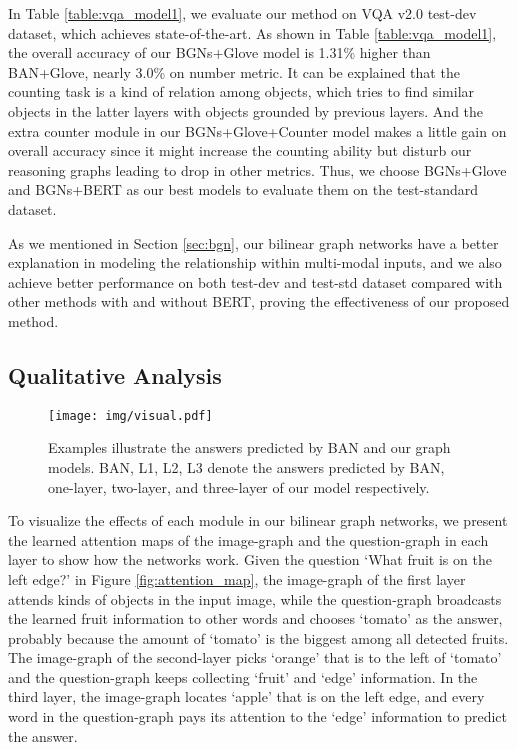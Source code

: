 \documentclass[10pt,twocolumn,letterpaper]{article}
\begin{document}
In Table \ref{table:vqa_model1}, we evaluate our method on VQA v2.0 test-dev dataset, which achieves state-of-the-art. As shown in Table \ref{table:vqa_model1}, the overall accuracy of our BGNs+Glove model is 1.31\% higher than BAN+Glove, nearly 3.0\% on number metric. It can be explained that the counting task is a kind of relation among objects, which tries to find similar objects in the latter layers with objects grounded by previous layers. And the extra counter module \cite{zhang2018learning} in our BGNs+Glove+Counter model makes a little gain on overall accuracy since it might increase the counting ability but disturb our reasoning graphs leading to drop in other metrics. Thus, we choose BGNs+Glove and BGNs+BERT as our best models to evaluate them on the test-standard dataset. 

As we mentioned in Section \ref{sec:bgn}, our bilinear graph networks have a better explanation in modeling the relationship within multi-modal inputs, and we also achieve better performance on both test-dev and test-std dataset compared with other methods with and without BERT, proving the effectiveness of our proposed method.

\vspace{-5pt}
\subsection{Qualitative Analysis}
\begin{figure*}
	\centering
	\texttt{[image: img/visual.pdf]}
	\caption{Examples illustrate the answers predicted by BAN and our graph models. BAN, L1, L2, L3 denote the answers predicted by BAN, one-layer, two-layer, and three-layer of our model respectively.}
	\label{fig:visual}
	\vspace{-5pt}
\end{figure*}
To visualize the effects of each module in our bilinear graph networks, we present the learned attention maps of the image-graph and the question-graph in each layer to show how the networks work. Given the question `What fruit is on the left edge?' in Figure \ref{fig:attention_map}, the image-graph of the first layer attends kinds of objects in the input image, while the question-graph broadcasts the learned fruit information to other words and chooses `tomato' as the answer, probably because the amount of `tomato' is the biggest among all detected fruits. The image-graph of the second-layer picks `orange' that is to the left of `tomato' and the question-graph keeps collecting `fruit' and `edge' information. In the third layer, the image-graph locates `apple' that is on the left edge, and every word in the question-graph pays its attention to the `edge' information to predict the answer.
\end{document}
